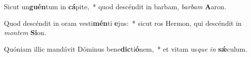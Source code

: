 \item Sicut un\textbf{guén}tum in \textbf{cá}pite,~* quod descéndit in barbam, \textit{bar}\textit{bam} \textbf{A}aron.
\item Quod descéndit in oram vesti\textbf{mén}ti \textbf{e}jus:~* sicut ros Hermon, qui descéndit in \textit{mon}\textit{tem} \textbf{Si}on.
\item Quóniam illic mandávit Dóminus bene\textbf{dic}ti\textbf{ó}nem,~* et vitam us\textit{que} \textit{in} \textbf{sǽ}culum.
